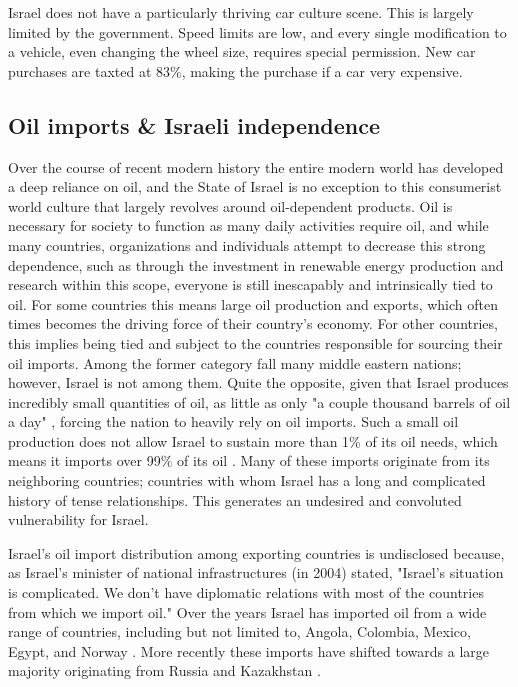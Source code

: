 \documentclass{article}                         %
\begin{document}
Israel does not have a particularly thriving car culture scene. This is largely limited by the government. Speed limits are low, and every single modification to a vehicle, even changing the wheel size, requires special permission. New car purchases are taxted at 83\%, making the purchase if a car very expensive.

\subsection{Oil imports \& Israeli independence}
	Over the course of recent modern history the entire modern world has developed a deep reliance on oil, and the State of Israel is no exception to this consumerist world culture that largely revolves around oil-dependent products. Oil is necessary for society to function as many daily activities require oil, and while many countries, organizations and individuals attempt to decrease this strong dependence, such as through the investment in renewable energy production and research within this scope, everyone is still inescapably and intrinsically tied to oil. For some countries this means large oil production and exports, which often times becomes the driving force of their country's economy. For other countries, this implies being tied and subject to the countries responsible for sourcing their oil imports. Among the former category fall many middle eastern nations; however, Israel is not among them. Quite the opposite, given that Israel produces incredibly small quantities of oil, as little as only "a couple thousand barrels of oil a day" \cite{Engber2006WhereOil}, forcing the nation to heavily rely on oil imports. Such a small oil production does not allow Israel to sustain more than 1\% of its oil needs, which means it imports over 99\% of its oil \cite{Engber2006WhereOil}. Many of these imports originate from its neighboring countries; countries with whom Israel has a long and complicated history of tense relationships. This generates an undesired and convoluted vulnerability for Israel.
    
    Israel's oil import distribution among exporting countries is undisclosed because, as Israel's minister of national infrastructures (in 2004) stated, "Israel's situation is complicated. We don't have diplomatic relations with most of the countries from which we import oil." \cite{Engber2006WhereOil} Over the years Israel has imported oil from a wide range of countries, including but not limited to, Angola, Colombia, Mexico, Egypt, and Norway \cite{Engber2006WhereOil}. More recently these imports have shifted towards a large majority originating from Russia and Kazakhstan \cite{Engber2006WhereOil}. 
	
\end{document}
